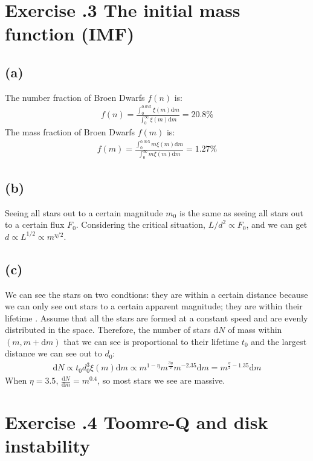\documentclass[a4paper,12pt]{article}
\renewcommand{\d}{\mathrm{d}}
\begin{document}
\section*{\textbf{Exercise \uppercase\expandafter{}.3  The initial mass function (IMF)}}
\subsection*{(a)}
The number fraction of Broen Dwarfs $f(n)$ is:
\begin{align*}
    f(n) = \frac{\int_{0}^{0.075} \xi(m) \d m}{\int_{0}^{\infty } \xi(m) \d m} = 20.8\%
\end{align*}
The mass fraction of Broen Dwarfs $f(m)$ is:
\begin{align*}
    f(m) = \frac{\int_{0}^{0.075} m \xi(m) \d m}{\int_{0}^{\infty } m \xi(m) \d m} = 1.27\%
\end{align*}

\subsection*{(b)}
Seeing all stars out to a certain magnitude $m_0$ is the same as 
seeing all stars out to a certain flux $F_0$. Considering the critical situation, 
$L/d^2 \propto F_0$, and we can get $d \propto L^{1/2} \propto m^{\eta/2}$.

\subsection*{(c)}
We can see the stars on two condtions: they are within a certain distance  because we can only see out 
stars to a certain apparent magnitude; they are within their lifetime . 
Assume that all the stars are formed at a constant speed and are evenly distributed in the space.
Therefore, the number of stars $\d N$ of mass within $(m, m+\d m)$ that we can see is proportional to 
their lifetime $t_0$ and the largest distance we can see out to $d_0$:
\begin{align*}
    \d N \propto t_0 d_0^3 \xi(m) \d m \propto m^{1-\eta} m^{\frac{3\eta}{2}} m^{-2.35} \d m = m^{\frac{\eta}{2}-1.35} \d m
\end{align*}
When $\eta=3.5$, $\frac{\d N}{\d m} = m^{0.4}$, so most stars we see are massive.

\section*{\textbf{Exercise \uppercase\expandafter{}.4 Toomre-Q and disk instability}}
\end{document}
